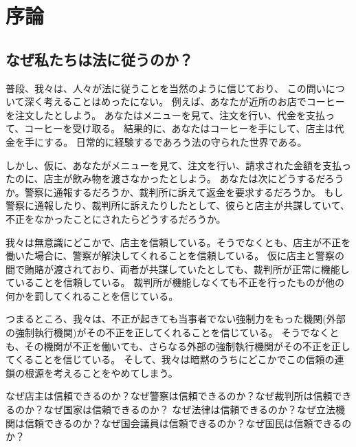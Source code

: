 
\chapter{序論}

  \section{なぜ私たちは法に従うのか？} %
  
  普段、我々は、人々が法に従うことを当然のように信じており、
  この問いについて深く考えることはめったにない。
  例えば、あなたが近所のお店でコーヒーを注文したとしよう。
  あなたはメニューを見て、注文を行い、代金を支払って、コーヒーを受け取る。
  結果的に、あなたはコーヒーを手にして、店主は代金を手にする。
  日常的に経験するであろう法の守られた世界である。

  しかし、仮に、あなたがメニューを見て、注文を行い、請求された金額を支払ったのに、店主が飲み物を渡さなかったとしよう。
  あなたは次にどうするだろうか。警察に通報するだろうか、裁判所に訴えて返金を要求するだろうか。
  もし警察に通報したり、裁判所に訴えたりしたとして、彼らと店主が共謀していて、不正をなかったことにされたらどうするだろうか。
  
  我々は無意識にどこかで、店主を信頼している。そうでなくとも、店主が不正を働いた場合に、警察が解決してくれることを信頼している。
  仮に店主と警察の間で賄賂が渡されており、両者が共謀していたとしても、裁判所が正常に機能していることを信頼している。
  裁判所が機能しなくても不正を行ったものが他の何かを罰してくれることを信じている。

  つまるところ、我々は、不正が起きても当事者でない強制力をもった機関(外部の強制執行機関)がその不正を正してくれることを信じている。
  そうでなくとも、その機関が不正を働いても、さらなる外部の強制執行機関がその不正を正してくることを信じている。
  そして、我々は暗黙のうちにどこかでこの信頼の連鎖の根源を考えることをやめてしまう。

  なぜ店主は信頼できるのか？なぜ警察は信頼できるのか？なぜ裁判所は信頼できるのか？なぜ国家は信頼できるのか？
  なぜ法律は信頼できるのか？なぜ立法機関は信頼できるのか？なぜ国会議員は信頼できるのか？なぜ国民は信頼できるのか？

